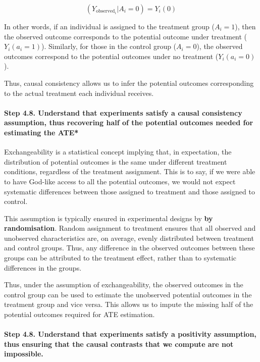 \documentclass[
  singlecolumn]{article}
\let\oldparagraph\paragraph
\renewcommand{\paragraph}[1]{\oldparagraph{#1}\mbox{}}
\begin{document}
\[
(Y_{\text{observed}_i}|A_i = 0) = Y_i(0)
\]

In other words, if an individual is assigned to the treatment group
(\(A_i = 1\)), then the observed outcome corresponds to the potential
outcome under treatment (\(Y_i(a_i = 1)\)). Similarly, for those in the
control group (\(A_i = 0\)), the observed outcomes correspond to the
potential outcomes under no treatment (\(Y_i(a_i = 0)\)).

Thus, causal consistency allows us to infer the potential outcomes
corresponding to the actual treatment each individual receives.

\paragraph{\texorpdfstring{\textbf{Step 4.8. Understand that experiments
satisfy a causal consistency assumption, thus recovering half of the
potential outcomes needed for estimating the
ATE}*}{Step 4.8. Understand that experiments satisfy a causal consistency assumption, thus recovering half of the potential outcomes needed for estimating the ATE*}}\label{step-4.8.-understand-that-experiments-satisfy-a-causal-consistency-assumption-thus-recovering-half-of-the-potential-outcomes-needed-for-estimating-the-ate}

Exchangeability is a statistical concept implying that, in expectation,
the distribution of potential outcomes is the same under different
treatment conditions, regardless of the treatment assignment. This is to
say, if we were able to have God-like access to all the potential
outcomes, we would not expect systematic differences between those
assigned to treatment and those assigned to control.

This assumption is typically ensured in experimental designs by
\textbf{by randomisation}. Random assignment to treatment ensures that
all observed and unobserved characteristics are, on average, evenly
distributed between treatment and control groups. Thus, any difference
in the observed outcomes between these groups can be attributed to the
treatment effect, rather than to systematic differences in the groups.

Thus, under the assumption of exchangeability, the observed outcomes in
the control group can be used to estimate the unobserved potential
outcomes in the treatment group and vice versa. This allows us to impute
the missing half of the potential outcomes required for ATE estimation.

\paragraph{\texorpdfstring{\textbf{Step 4.8. Understand that experiments
satisfy a positivity assumption, thus ensuring that the causal contrasts
that we compute are not
impossible.}}{Step 4.8. Understand that experiments satisfy a positivity assumption, thus ensuring that the causal contrasts that we compute are not impossible.}}\label{step-4.8.-understand-that-experiments-satisfy-a-positivity-assumption-thus-ensuring-that-the-causal-contrasts-that-we-compute-are-not-impossible.}
\end{document}
